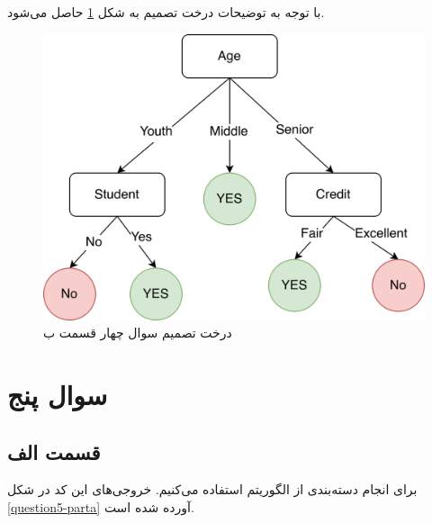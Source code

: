 \documentclass{article}
\begin{document}
با توجه به توضیحات درخت تصمیم به شکل \ref{q4-final-decision-tree} حاصل می‌شود.

\begin{figure}[h]
    \centering
    \includegraphics[scale=0.5]{images/q4/decision-tree.png}
    \caption{درخت تصمیم سوال چهار قسمت ب}
    \label{q4-final-decision-tree}
\end{figure}

\section*{سوال پنج}

\subsection*{قسمت الف}

برای انجام دسته‌بندی از الگوریتم  استفاده می‌کنیم.
خروجی‌های این کد در شکل \ref{question5-parta} آورده شده است.
\end{document}
